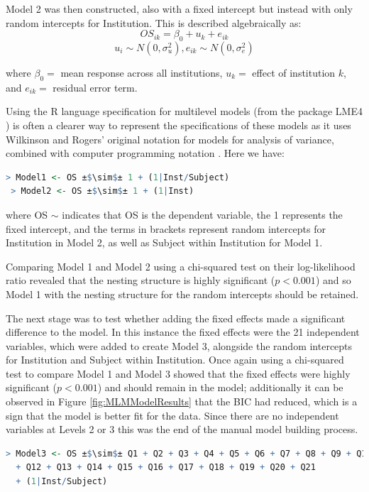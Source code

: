 \documentclass[11pt,a4paper]{report}
\begin{document}
\newpage
Model 2 was then constructed, also with a fixed intercept but instead with only random intercepts for Institution. This is described algebraically as: 
\[OS_{i k} = \beta_{0} + u_{ k} + e_{i k} \]
\[u_{i} \sim N(0, \sigma^{2}_u), e_{i k} \sim N(0, \sigma^{2}_e) \]

where
$\beta_{0} =$ mean response across all institutions,
$u_{ k} =$ effect of institution  $k$, and
$e_{i k} =$ residual error term.

Using the R language specification for multilevel models (from the package LME4 \cite{R_lme4}) is often a clearer way to represent the specifications of these models as it uses Wilkinson and Rogers' original notation for models for analysis of variance, combined with computer programming notation \cite{wilkinson1973symbolic}. Here we have: 
{\footnotesize
\begin{lstlisting}[backgroundcolor = \color{light-gray}, language=R, escapechar=±]
 > Model1 <- OS ±$\sim$± 1 + (1|Inst/Subject)
 > Model2 <- OS ±$\sim$± 1 + (1|Inst)
\end{lstlisting}
}
where OS $\sim$ indicates that OS is the dependent variable, the 1 represents the fixed intercept, and the terms in brackets represent random intercepts for Institution in Model 2, as well as Subject within Institution for Model 1. 

Comparing Model 1 and Model 2 using a chi-squared test on their log-likelihood ratio revealed that the nesting structure is highly significant ($p < 0.001$) and so Model 1 with the nesting structure for the random intercepts should be retained.

The next stage was to test whether adding the fixed effects made a significant difference to the model. In this instance the fixed effects were the 21 independent variables, which were added to create Model 3, alongside the random intercepts for Institution and Subject within Institution. Once again using a chi-squared test to compare Model 1 and Model 3 showed that the fixed effects were highly significant ($p < 0.001$) and should remain in the model; additionally it can be observed in Figure \ref{fig:MLMModelResults} that the \ac{BIC} had reduced, which is a sign that the model is better fit for the data. Since there are no independent variables at Levels 2 or 3 this was the end of the manual model building process. 

{\footnotesize
\begin{lstlisting}[backgroundcolor = \color{light-gray}, language=R, escapechar=±]
 > Model3 <- OS ±$\sim$± Q1 + Q2 + Q3 + Q4 + Q5 + Q6 + Q7 + Q8 + Q9 + Q10 + Q11
  + Q12 + Q13 + Q14 + Q15 + Q16 + Q17 + Q18 + Q19 + Q20 + Q21 
  + (1|Inst/Subject)
\end{lstlisting}
}
\end{document}
